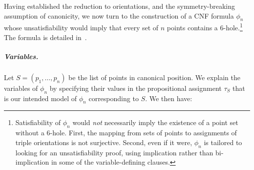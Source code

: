 Having established the reduction to orientations,
and the symmetry-breaking assumption of canonicity,
we now turn to the construction of a CNF formula $\phi_n$
whose unsatisfiability would imply
that every set of $n$ points
contains a $6$-hole.\footnote{
  Satisfiability of $\phi_n$ would \emph{not} necessarily imply
  the existence of a point set without a $6$-hole.
  First, the mapping from sets of points to assignments of triple orientations is not surjective.
  Second, even if it were, $\phi_n$ is tailored to looking for an unsatisfiability proof,
  using implication rather than bi-implication in some of the variable-defining clauses.
}
The formula is detailed in~.



\subparagraph*{Variables.}
Let $S = (p_1, \ldots, p_n)$ be the list of points in canonical position.
We explain the variables of $\phi_n$
by specifying their values in the propositional assignment $\tau_S$
that is our intended model of $\phi_n$
corresponding to $S$. We then have:
